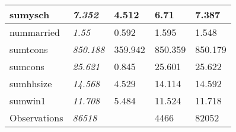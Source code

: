 \documentclass[]{article}
\begin{document}
\begin{table}[H]
\begin{tabular}{>{}l||>{\em}l|l|l|l}
\hline
sumysch & 7.352 & 4.512 & 6.71 & 7.387\\
\hline
nummarried & 1.55 & 0.592 & 1.595 & 1.548\\
\hline
sumtcons & 850.188 & 359.942 & 850.359 & 850.179\\
\hline
sumcons & 25.621 & 0.845 & 25.601 & 25.622\\
\hline
sumhhsize & 14.568 & 4.529 & 14.114 & 14.592\\
\hline
sumwin1 & 11.708 & 5.484 & 11.524 & 11.718\\
\hline
Observations & 86518 &  & 4466 & 82052\\
\hline
\end{tabular}
\endgroup{}
\end{table}
\end{document}
